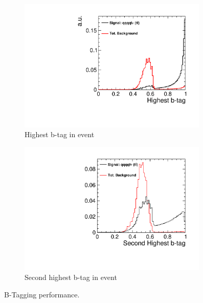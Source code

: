 

\begin{figure}
  \centering
  \begin{subfigure}{.5\textwidth}
    \centering
    \includegraphics[width=0.99\textwidth]{TopAnalysis/figures/HighestBTag.pdf}
    \caption[Highest b-tag in event]{Highest b-tag in event}
  \end{subfigure}%
  \begin{subfigure}{.5\textwidth}
    \centering
    \includegraphics[width=0.99\textwidth]{TopAnalysis/figures/NextHighestBTag.pdf}
    \caption[Second highest b-tag event in event]{Second highest b-tag in event}
  \end{subfigure}
  \caption[B-Tagging performance]{B-Tagging performance.}
  \label{fig:btagging}
\end{figure}


